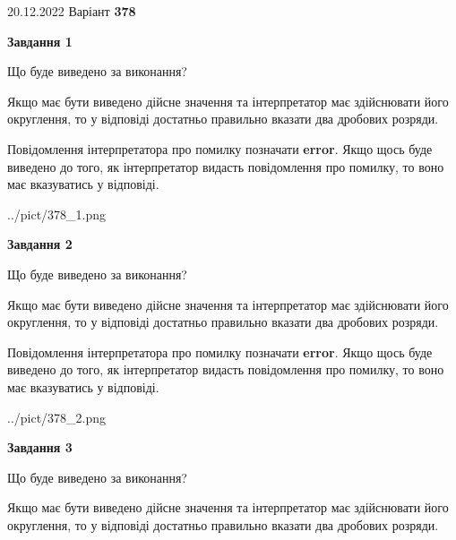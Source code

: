 \documentclass[12pt, ukrainian]{article}
\begin{document}
{20.12.2022 Варіант \No \textbf { 378 }\par}
{
\begin {Large}

{\begin {center}\textbf{Завдання 1}\end {center}}\par
Що буде виведено за виконання? \par

Якщо має бути виведено дійсне значення та інтерпретатор має здійснювати його округлення, 
то у відповіді достатньо правильно вказати два дробових розряди.

Повідомлення інтерпретатора про помилку позначати \textbf{error}.
Якщо щось буде виведено до того, як інтерпретатор видасть повідомлення про помилку, 
то воно має вказуватись у відповіді. \par

\begin{center}
	{../pict/378_1.png}
\end{center}
\newpage

{\begin {center}\textbf{Завдання 2}\end {center}}\par
Що буде виведено за виконання? \par

Якщо має бути виведено дійсне значення та інтерпретатор має здійснювати його округлення, 
то у відповіді достатньо правильно вказати два дробових розряди.

Повідомлення інтерпретатора про помилку позначати \textbf{error}.
Якщо щось буде виведено до того, як інтерпретатор видасть повідомлення про помилку, 
то воно має вказуватись у відповіді. \par

\begin{center}
	{../pict/378_2.png}
\end{center}
\newpage

{\begin {center}\textbf{Завдання 3}\end {center}}\par
Що буде виведено за виконання? \par

Якщо має бути виведено дійсне значення та інтерпретатор має здійснювати його округлення, 
то у відповіді достатньо правильно вказати два дробових розряди.


\end{Large}}
\end{document}
